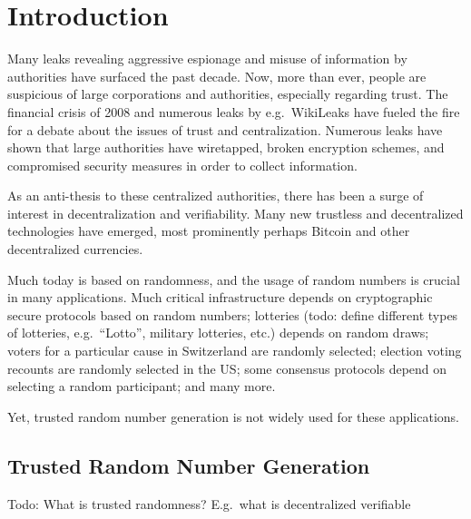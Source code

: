 \section{Introduction}\label{cha:introduction}

Many leaks revealing aggressive espionage and misuse of information by authorities have surfaced the past decade. Now, more than ever, people are suspicious of large corporations and authorities, especially regarding trust. The financial crisis of 2008 and numerous leaks by e.g.\ WikiLeaks have fueled the fire for a debate about the issues of trust and centralization. Numerous leaks have shown that large authorities have wiretapped, broken encryption schemes, and compromised security measures in order to collect information.

As an anti-thesis to these centralized authorities, there has been a surge of interest in decentralization and verifiability. Many new trustless and decentralized technologies have emerged, most prominently perhaps Bitcoin and other decentralized currencies.

Much today is based on randomness, and the usage of random numbers is crucial in many applications. Much critical infrastructure depends on cryptographic secure protocols based on random numbers; lotteries (todo: define different types of lotteries, e.g.\ \enquote{Lotto}, military lotteries, etc.) depends on random draws; voters for a particular cause in Switzerland are randomly selected; election voting recounts are randomly selected in the US\@; some consensus protocols depend on selecting a random participant; and many more.

Yet, trusted random number generation is not widely used for these applications.

\subsection{Trusted Random Number Generation} %
Todo: What is trusted randomness? E.g.\ what is decentralized verifiable



